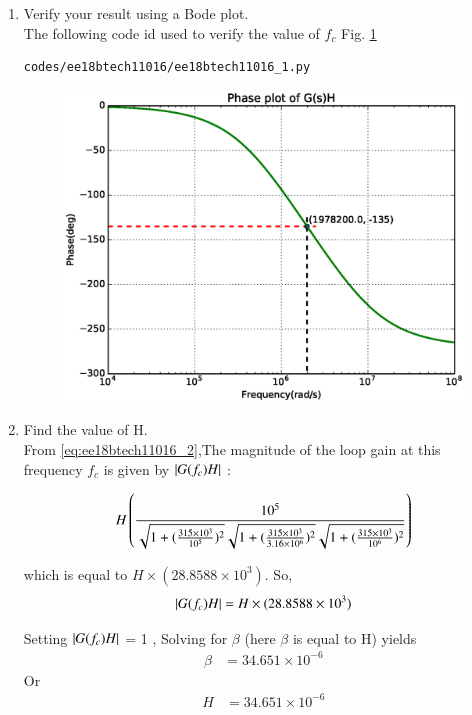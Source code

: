 \begin{enumerate}[label=\arabic*.,ref=\theenumi]
\item Verify your result using a Bode plot.
\\
\solution  The following code  id used to verify the value of $f_{c}$ Fig. \ref{fig:ee18btech11016_1}

\begin{lstlisting}
codes/ee18btech11016/ee18btech11016_1.py
\end{lstlisting}
%
\begin{figure}[!h]
\centering
\includegraphics[width=\columnwidth]{./figs/ee18btech11016/ee18btech11016_resultbode.eps}
\caption{}
\label{fig:ee18btech11016_1}
\end{figure}

\item Find the value of H.\\
\solution From \eqref{eq:ee18btech11016_2},The magnitude of the loop gain at this frequency $f_{c}$ is given by $\left\vert G(f_{c})H\right\vert$ :
 
\begin{align}
    H\left(\frac{10^5}{\sqrt{1+(\frac{315\times10^3}{10^5})^2}\sqrt{1+(\frac{315\times10^3}{3.16\times10^6})^2}\sqrt{1+(\frac{315\times10^3}{10^6})^2}}\right)
\end{align}

which is equal to $H\times(28.8588\times10^3)$.
So,
\begin{align}
\left\vert G(f_{c})H\right\vert = H\times(28.8588\times10^3)
\end{align}

Setting $\left\vert G(f_{c})H\right\vert$ = 1 , Solving for $\beta$ (here $\beta$ is equal to H) yields 
\begin{align}
\beta &= 34.651\times10^{-6}
\end{align}
Or
\begin{align}
H &= 34.651\times10^{-6}
\end{align}


\end{enumerate}
